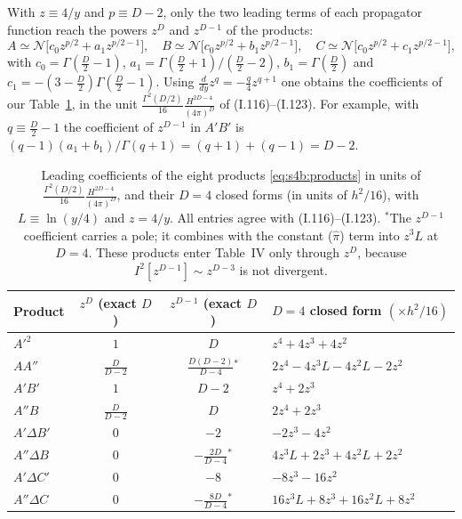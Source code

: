 \documentclass[aps,prd,onecolumn,10pt,nofootinbib,floatfix]{revtex4-2}
\newcommand{\eqI}[1]{(I.#1)}
\newcommand{\pihat}{\hat\pi}
\begin{document}
With $z\equiv4/y$ and $p\equiv D-2$, only the two leading terms of each propagator function reach the powers $z^D$
and $z^{D-1}$ of the products:
\begin{equation}
A\simeq\mathcal N\big[c_0z^{p/2}+a_1z^{p/2-1}\big],\quad
B\simeq\mathcal N\big[c_0z^{p/2}+b_1z^{p/2-1}\big],\quad
C\simeq\mathcal N\big[c_0z^{p/2}+c_1z^{p/2-1}\big],
\end{equation}
with $c_0=\Gamma(\frac D2-1)$, $a_1=\Gamma(\frac D2+1)/(\frac D2-2)$, $b_1=\Gamma(\frac D2)$ and
$c_1=-(3-\frac D2)\Gamma(\frac D2-1)$. Using $\frac{d}{dy}z^q=-\frac q4z^{q+1}$ one obtains the coefficients of
our Table~\ref{tab:s4b:products}, in the unit $\frac{\Gamma^2(D/2)}{16}\frac{H^{2D-4}}{(4\pi)^D}$ of \eqI{116}--\eqI{123}. For
example, with $q\equiv\frac D2-1$ the coefficient of $z^{D-1}$ in $A'B'$ is $(q-1)(a_1+b_1)/\Gamma(q+1)=(q+1)+(q-1)=D-2$.

\begin{table}[tb]
\caption{Leading coefficients of the eight products \eqref{eq:s4b:products} in units of
$\frac{\Gamma^2(D/2)}{16}\frac{H^{2D-4}}{(4\pi)^D}$, and their $D=4$ closed forms (in units of $h^2/16$), with
$L\equiv\ln(y/4)$ and $z=4/y$. All entries agree with \eqI{116}--\eqI{123}. $^{*}$The $z^{D-1}$ coefficient carries a pole;
it combines with the constant ($\pihat$) term into $z^3L$ at $D=4$. These products enter Table~IV only through
$z^D$, because $I^2[z^{D-1}]\sim z^{D-3}$ is not divergent.}
\label{tab:s4b:products}
\renewcommand{\arraystretch}{1.3}
\begin{ruledtabular}
\begin{tabular}{@{}lccl@{}}
Product & $z^D$ (exact $D$) & $z^{D-1}$ (exact $D$) & $D=4$ closed form $(\times h^2/16)$\\
\hline
$A'^2$ & $1$ & $D$ & $z^4+4z^3+4z^2$\\
$AA''$ & $\frac{D}{D-2}$ & $\frac{D(D-2)}{D-4}{}^{*}$ & $2z^4-4z^3L-4z^2L-2z^2$\\
$A'B'$ & $1$ & $D-2$ & $z^4+2z^3$\\
$A''B$ & $\frac{D}{D-2}$ & $D$ & $2z^4+2z^3$\\
$A'\Delta B'$ & $0$ & $-2$ & $-2z^3-4z^2$\\
$A''\Delta B$ & $0$ & $-\frac{2D}{D-4}{}^{*}$ & $4z^3L+2z^3+4z^2L+2z^2$\\
$A'\Delta C'$ & $0$ & $-8$ & $-8z^3-16z^2$\\
$A''\Delta C$ & $0$ & $-\frac{8D}{D-4}{}^{*}$ & $16z^3L+8z^3+16z^2L+8z^2$\\
\end{tabular}
\end{ruledtabular}
\end{table}
\end{document}
